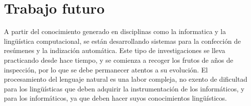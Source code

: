 \section{Trabajo futuro}

A partir del conocimiento generado en disciplinas como la informatica y la lingüística computacional, se están desarrollando sistemas para la confección de resúmenes y la indización automática. Este tipo de investigaciones se lleva practicando desde hace tiempo, y se comienza a recoger los frutos de años de inspección, por lo que se debe permanecer atentos a su evolución. El procesamiento del lenguaje natural es una labor
compleja, no exento de dificultad para los lingüísticas que deben adquirir la instrumentación de los informáticos, y para los informáticos, ya que deben hacer suyos
conocimientos lingüísticos.
